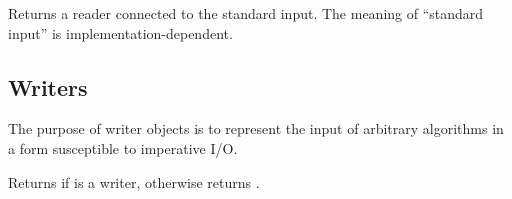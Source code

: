 \begin{entry}{%
}
   
Returns a reader connected to the standard input. The meaning of
``standard input'' is implementation-dependent.
\end{entry}

\subsection{Writers}

The purpose of writer objects is to represent the input of arbitrary
algorithms in a form susceptible to imperative I/O.

\begin{entry}{%
}
   
Returns \schtrue{} if  is a writer, otherwise returns \schfalse.
\end{entry}


